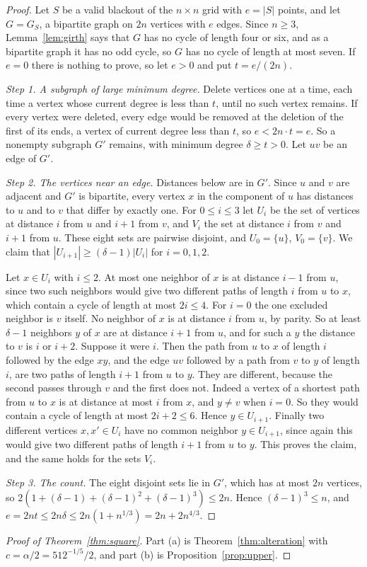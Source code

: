 \begin{proof}
Let $S$ be a valid blackout of the $n\times n$ grid with $e=|S|$ points, and let $G=G_S$, a bipartite graph on $2n$ vertices with $e$ edges. Since $n\ge3$, Lemma~\ref{lem:girth} says that $G$ has no cycle of length four or six, and as a bipartite graph it has no odd cycle, so $G$ has no cycle of length at most seven. If $e=0$ there is nothing to prove, so let $e>0$ and put $t=e/(2n)$.

\emph{Step 1. A subgraph of large minimum degree.} Delete vertices one at a time, each time a vertex whose current degree is less than $t$, until no such vertex remains. If every vertex were deleted, every edge would be removed at the deletion of the first of its ends, a vertex of current degree less than $t$, so $e<2n\cdot t=e$. So a nonempty subgraph $G'$ remains, with minimum degree $\delta\ge t>0$. Let $uv$ be an edge of $G'$.

\emph{Step 2. The vertices near an edge.} Distances below are in $G'$. Since $u$ and $v$ are adjacent and $G'$ is bipartite, every vertex $x$ in the component of $u$ has distances to $u$ and to $v$ that differ by exactly one. For $0\le i\le3$ let $U_i$ be the set of vertices at distance $i$ from $u$ and $i+1$ from $v$, and $V_i$ the set at distance $i$ from $v$ and $i+1$ from $u$. These eight sets are pairwise disjoint, and $U_0=\{u\}$, $V_0=\{v\}$. We claim that $|U_{i+1}|\ge(\delta-1)|U_i|$ for $i=0,1,2$.

Let $x\in U_i$ with $i\le2$. At most one neighbor of $x$ is at distance $i-1$ from $u$, since two such neighbors would give two different paths of length $i$ from $u$ to $x$, which contain a cycle of length at most $2i\le4$. For $i=0$ the one excluded neighbor is $v$ itself. No neighbor of $x$ is at distance $i$ from $u$, by parity. So at least $\delta-1$ neighbors $y$ of $x$ are at distance $i+1$ from $u$, and for such a $y$ the distance to $v$ is $i$ or $i+2$. Suppose it were $i$. Then the path from $u$ to $x$ of length $i$ followed by the edge $xy$, and the edge $uv$ followed by a path from $v$ to $y$ of length $i$, are two paths of length $i+1$ from $u$ to $y$. They are different, because the second passes through $v$ and the first does not. Indeed a vertex of a shortest path from $u$ to $x$ is at distance at most $i$ from $x$, and $y\ne v$ when $i=0$. So they would contain a cycle of length at most $2i+2\le6$. Hence $y\in U_{i+1}$. Finally two different vertices $x,x'\in U_i$ have no common neighbor $y\in U_{i+1}$, since again this would give two different paths of length $i+1$ from $u$ to $y$. This proves the claim, and the same holds for the sets $V_i$.

\emph{Step 3. The count.} The eight disjoint sets lie in $G'$, which has at most $2n$ vertices, so $2(1+(\delta-1)+(\delta-1)^2+(\delta-1)^3)\le2n$. Hence $(\delta-1)^3\le n$, and $e=2nt\le2n\delta\le2n(1+n^{1/3})=2n+2n^{4/3}$.
\end{proof}

\begin{proof}[Proof of Theorem~\ref{thm:square}]
Part (a) is Theorem~\ref{thm:alteration} with $c=\alpha/2=512^{-1/5}/2$, and part (b) is Proposition~\ref{prop:upper}.
\end{proof}
